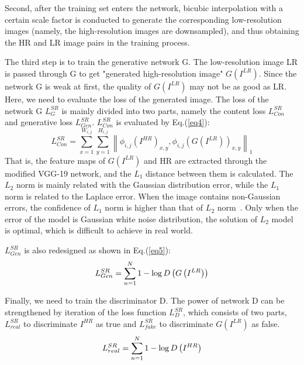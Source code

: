 \documentclass[10pt,twocolumn,letterpaper]{article}
\begin{document}
Second, after the training set enters the network, bicubic interpolation with a certain scale factor is conducted to generate the corresponding low-resolution images (namely, the high-resolution images are downsampled), and thus obtaining the HR and LR image pairs in the training process.

The third step is to train the generative network G. The low-resolution image LR is passed through G to get "generated high-resolution image" $G{\left(I^{L R}\right)}$. Since the network G is weak at first, the quality of $G{\left(I^{L R}\right)}$ may not be as good as LR. Here, we need to evaluate the loss of the generated image. The loss of the network G $L_{G}^{SR}$ is mainly divided into two parts, namely the content loss $L_{Con}^{SR} $ and generative loss $L_{Gen} ^{SR}$. $L_{Con}^{SR}$ is evaluated by Eq.(\ref{eq4}):
\begin{equation}\label{eq4}
L_{Con}^{SR} = \sum\limits_{x = 1}^{{W_{i,j}}} {\sum\limits_{y = 1}^{{H_{i,j}}} {{{\left\| {{\phi _{i,j}}{{\left( {{I^{HR}}} \right)}_{x,y}},{\phi _{i,j}}{{\left( {G\left( {{I^{LR}}} \right)} \right)}_{x,y}}} \right\|}_1}} } 
\end{equation} 
That is, the feature maps of $G{\left(I^{LR}\right)}$ and HR are extracted through the modified VGG-19 network, and the $L_1$ distance between them is calculated. The $L_2$ norm is mainly related with the Gaussian distribution error, while the $L_1$ norm is related to the Laplace error. When the image contains non-Gaussian errors, the confidence of $L_1$ norm is higher than that of $L_2$ norm~\cite{song2010adaptive}. Only when the error of the model is Gaussian white noise distribution, the solution of $L_2$ model is optimal, which is difficult to achieve in real world. 

$L_{Gen}^{SR}$ is also redesigned as shown in Eq.(\ref{eq5}):
\begin{equation}\label{eq5}
L_{Gen}^{SR} = \sum\limits_{n = 1}^N {{\rm{1}} - \log D\left( {G\left( {{I^{LR}}} \right)} \right)} 
\end{equation}

Finally, we need to train the discriminator D. The power of network D can be strengthened by iteration of the loss function $L_{D}^{SR}$, which consists of two parts,  $L_{real}^{SR}$ to discriminate $I^{HR}$ as true and $L_{fake}^{SR}$ to discriminate $G{\left(I^{L R}\right)}$ as false.
\begin{equation}\label{eq7}
L_{real}^{SR} = \sum\limits_{n = 1}^N {{\rm{1}} - \log D\left( {{I^{HR}}} \right)}
\end{equation}
\end{document}
